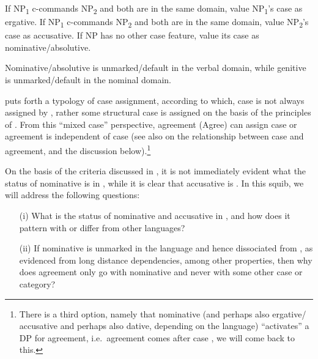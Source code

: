 \documentclass[output=paper]{langsci/langscibook}
\begin{document}
\ea%
    \label{ex:key:13.3}
    \ea If NP\textsubscript{1} c-commands NP\textsubscript{2} and both are in
        the same domain, value NP\textsubscript{1}’s case as ergative.
    \ex If NP\textsubscript{1} c-commands NP\textsubscript{2} and both are in
        the same domain, value NP\textsubscript{2}’s case as accusative.
    \ex If NP has no other case feature, value its case as
        nominative/absolutive.
    \z
\z

Nominative/absolutive is unmarked/default in the verbal domain, while genitive
is unmarked/default in the nominal domain.

\citet{Baker2015} puts forth a typology of case assignment, according to which,
case is not always assigned by , rather some structural case is
assigned on the basis of the principles of . From this
\enquote{mixed case} perspective, agreement (Agree) can assign case or
agreement is independent of case (see also \citealt{Baker2008} on the
relationship between case and agreement, and the discussion
below).\footnote{There is a third option, namely that nominative (and perhaps also ergative/ accusative and perhaps also dative, depending
on the language) \enquote{activates} a DP for agreement, i.e.\  agreement comes
after case \citep{Bobaljik2008}, we will come back to this.}

On the basis of the criteria discussed in \textcite{Baker2008,Baker2015}, it is
not immediately evident what the status of nominative is in , while it is
clear that accusative is . In this squib, we will address the
following questions:

\begin{itemize}

    \item[(i)] What is the status of nominative and accusative in , and
        how does it pattern with or differ from other languages?

    \item[(ii)] If nominative is unmarked in the language
        and hence dissociated from , as evidenced from long distance
        dependencies, among other properties, then why does agreement only go
        with nominative and never with some other case or
        category?

\end{itemize}
\end{document}
